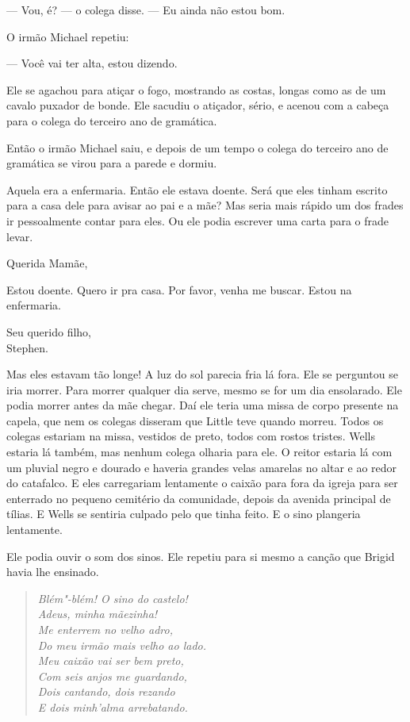  --- Vou, é? --- o colega disse. --- Eu ainda não estou bom.

O irmão Michael repetiu:

 --- Você vai ter alta, estou dizendo.

Ele se agachou para atiçar o fogo, mostrando as costas, longas como as de
um cavalo puxador de bonde. Ele sacudiu o atiçador, sério, e acenou com
a cabeça para o colega do terceiro ano de gramática.

Então o irmão Michael saiu, e depois de um tempo o colega do terceiro
ano de gramática se virou para a parede e dormiu.

Aquela era a enfermaria. Então ele estava doente. Será que eles tinham
escrito para a casa dele para avisar ao pai e a mãe? Mas seria mais
rápido um dos frades ir pessoalmente contar para eles. Ou ele podia
escrever uma carta para o frade levar.

\smallskip

Querida Mamãe,

Estou doente. Quero ir pra casa. Por favor, venha me buscar. Estou na
enfermaria.

{\raggedleft
Seu querido filho,\\
Stephen.
\par}

\smallskip

Mas eles estavam tão longe! A luz do sol parecia fria lá fora. Ele se
perguntou se iria morrer. Para morrer qualquer dia serve, mesmo se for
um dia ensolarado. Ele podia morrer antes da mãe chegar. Daí ele teria
uma missa de corpo presente na capela, que nem os colegas disseram que
Little teve quando morreu. Todos os colegas estariam na missa, vestidos
de preto, todos com rostos tristes. Wells estaria lá também, mas nenhum
colega olharia para ele. O reitor estaria lá com um pluvial negro e
dourado e haveria grandes velas amarelas no altar e ao redor do
catafalco. E eles carregariam lentamente o caixão para fora da igreja
para ser enterrado no pequeno cemitério da comunidade, depois da
avenida principal de tílias. E Wells se sentiria culpado pelo que tinha
feito. E o sino plangeria lentamente.

Ele podia ouvir o som dos sinos. Ele repetiu para si mesmo a canção que
Brigid havia lhe ensinado.

\begin{verse}\itshape
Blém"-blém! O sino do castelo!\\
Adeus, minha mãezinha!\\
Me enterrem no velho adro,\\
Do meu irmão mais velho ao lado.\\
Meu caixão vai ser bem preto,\\
Com seis anjos me guardando,\\
Dois cantando, dois rezando\\
E dois minh’alma arrebatando.
\end{verse}

